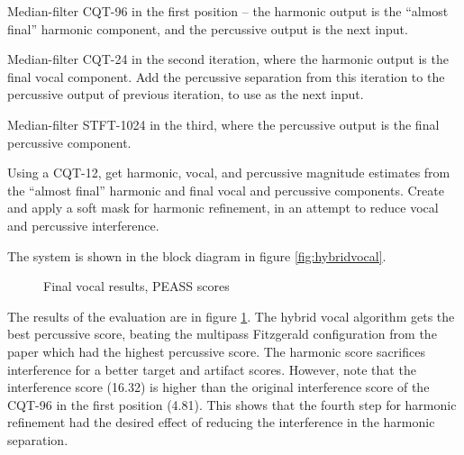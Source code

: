\documentclass[letter,12pt]{article}
\newenvironment{tight_enumerate}{
\begin{enumerate}
  \setlength{\itemsep}{0pt}
  \setlength{\parskip}{0pt}
}{\end{enumerate}}
\begin{document}
\begin{tight_enumerate}
	\item
		Median-filter CQT-96 in the first position -- the harmonic output is the ``almost final'' harmonic component, and the percussive output is the next input.
	\item
		Median-filter CQT-24 in the second iteration, where the harmonic output is the final vocal component. Add the percussive separation from this iteration to the percussive output of previous iteration, to use as the next input.
	\item
		Median-filter STFT-1024 in the third, where the percussive output is the final percussive component.
	\item
		Using a CQT-12, get harmonic, vocal, and percussive magnitude estimates from the ``almost final'' harmonic and final vocal and percussive components. Create and apply a soft mask for harmonic refinement, in an attempt to reduce vocal and percussive interference.
\end{tight_enumerate}

The system is shown in the block diagram in figure \ref{fig:hybridvocal}.

\begin{figure}[ht]
	\centering
	\vspace{-1.25em}
	\caption{Final vocal results, PEASS scores}
	\label{fig:finalvocal}
\end{figure}

The results of the evaluation are in figure \ref{fig:finalvocal}. The hybrid vocal algorithm gets the best percussive score, beating the multipass Fitzgerald configuration from the paper\cite{fitzgerald2} which had the highest percussive score. The harmonic score sacrifices interference for a better target and artifact scores. However, note that the interference score (16.32) is higher than the original interference score of the CQT-96 in the first position (4.81). This shows that the fourth step for harmonic refinement had the desired effect of reducing the interference in the harmonic separation.

\vfill
\clearpage %

\printbibheading[title={References}]
\printbibliography[heading=none]
\end{document}
